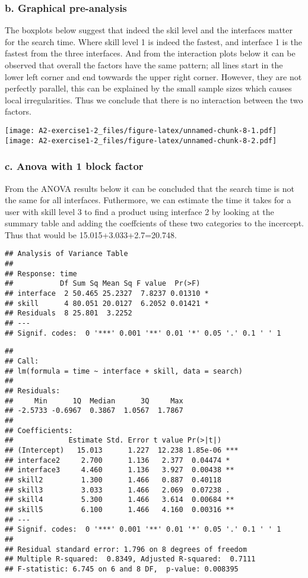 \documentclass[]{article}
\begin{document}
\hypertarget{b.-graphical-pre-analysis}{%
\subsubsection{b. Graphical
pre-analysis}\label{b.-graphical-pre-analysis}}

The boxplots below suggest that indeed the skil level and the interfaces
matter for the search time. Where skill level 1 is indeed the fastest,
and interface 1 is the fastest from the three interfaces. And from the
interaction plots below it can be observed that overall the factors have
the same pattern; all lines start in the lower left corner and end
towwards the upper right corner. However, they are not perfectly
parallel, this can be explained by the small sample sizes which causes
local irregularities. Thus we conclude that there is no interaction
between the two factors.

\texttt{[image: A2-exercise1-2\_files/figure-latex/unnamed-chunk-8-1.pdf]}
\texttt{[image: A2-exercise1-2\_files/figure-latex/unnamed-chunk-8-2.pdf]}

\hypertarget{c.-anova-with-1-block-factor}{%
\subsubsection{c. Anova with 1 block
factor}\label{c.-anova-with-1-block-factor}}

From the ANOVA results below it can be concluded that the search time is
not the same for all interfaces. Futhermore, we can estimate the time it
takes for a user with skill level 3 to find a product using interface 2
by looking at the summary table and adding the coeffcients of these two
categories to the incercept. Thus that would be 15.015+3.033+2.7=20.748.

\begin{verbatim}
## Analysis of Variance Table
## 
## Response: time
##           Df Sum Sq Mean Sq F value  Pr(>F)  
## interface  2 50.465 25.2327  7.8237 0.01310 *
## skill      4 80.051 20.0127  6.2052 0.01421 *
## Residuals  8 25.801  3.2252                  
## ---
## Signif. codes:  0 '***' 0.001 '**' 0.01 '*' 0.05 '.' 0.1 ' ' 1
\end{verbatim}

\begin{verbatim}
## 
## Call:
## lm(formula = time ~ interface + skill, data = search)
## 
## Residuals:
##     Min      1Q  Median      3Q     Max 
## -2.5733 -0.6967  0.3867  1.0567  1.7867 
## 
## Coefficients:
##             Estimate Std. Error t value Pr(>|t|)    
## (Intercept)   15.013      1.227  12.238 1.85e-06 ***
## interface2     2.700      1.136   2.377  0.04474 *  
## interface3     4.460      1.136   3.927  0.00438 ** 
## skill2         1.300      1.466   0.887  0.40118    
## skill3         3.033      1.466   2.069  0.07238 .  
## skill4         5.300      1.466   3.614  0.00684 ** 
## skill5         6.100      1.466   4.160  0.00316 ** 
## ---
## Signif. codes:  0 '***' 0.001 '**' 0.01 '*' 0.05 '.' 0.1 ' ' 1
## 
## Residual standard error: 1.796 on 8 degrees of freedom
## Multiple R-squared:  0.8349, Adjusted R-squared:  0.7111 
## F-statistic: 6.745 on 6 and 8 DF,  p-value: 0.008395
\end{verbatim}
\end{document}
